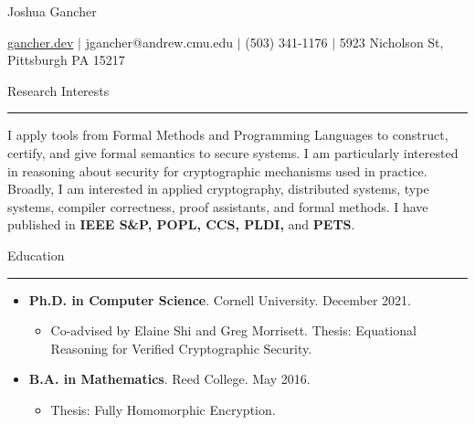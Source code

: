 \documentclass{article}
\newcommand{\rsection}[1]{\vspace{1em} {\huge #1} \vspace{0.5em} \hrule \vspace{1em}}
\begin{document}
\begin{center}
    \Huge Joshua Gancher
\end{center}
\begin{center}
    \url{gancher.dev} $\mid$ jgancher@andrew.cmu.edu $\mid$ (503) 341-1176 $\mid$ 5923
    Nicholson St, Pittsburgh PA 15217
 \end{center}

\rsection{Research Interests}

I apply tools from Formal Methods and Programming Languages 
to construct,
certify, and give formal semantics to secure systems.
I am particularly interested in reasoning about security for cryptographic
mechanisms used in practice.
Broadly, I am interested in applied cryptography, distributed systems, type systems, compiler
correctness, proof assistants, and formal methods. I have published in
\textbf{IEEE S\&P, POPL, CCS, PLDI,} and \textbf{PETS}. 

\rsection{Education}
\begin{itemize}
    \item {\bf Ph.D. in Computer Science}. Cornell University. December 2021.
        \begin{itemize}
            \item Co-advised by Elaine Shi and Greg Morrisett. Thesis:  Equational Reasoning for Verified Cryptographic
                Security.
        \end{itemize}
    \item {\bf B.A. in Mathematics}. Reed College. May 2016.
        \begin{itemize}
            \item Thesis: Fully Homomorphic Encryption.
        \end{itemize}
\end{itemize}
\end{document}
